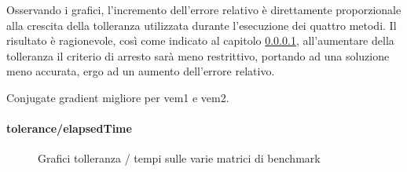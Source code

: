 Osservando i grafici, l'incremento dell'errore relativo è direttamente proporzionale alla crescita della tolleranza utilizzata durante l'esecuzione dei quattro metodi. Il risultato è ragionevole, così come indicato al capitolo \ref{tol/time, diff methods}, all'aumentare della tolleranza il criterio di arresto sarà meno restrittivo, portando ad una soluzione meno accurata, ergo ad un aumento dell'errore relativo.

Conjugate gradient migliore per vem1 e vem2.

\paragraph{tolerance/elapsedTime}\label{tol/time, diff methods}


\begin{figure}%
	\centering
	\qquad
	\caption{Grafici tolleranza / tempi sulle varie matrici di benchmark}%
\end{figure}

